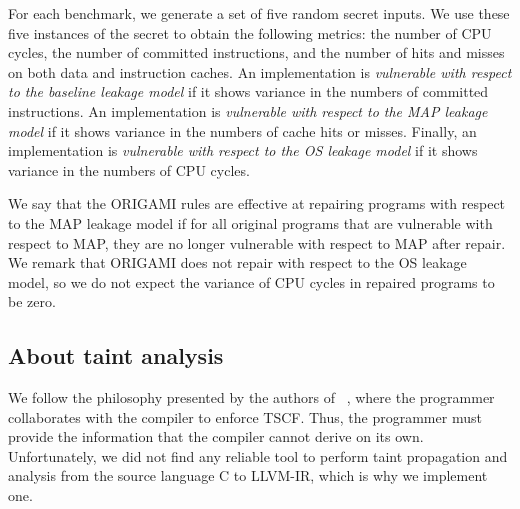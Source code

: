 { %

For each benchmark, we generate a set of five random secret inputs. %
We use these five instances of the secret to obtain the following metrics: the number of CPU cycles, the number of committed instructions, and the number of hits and misses on both data and instruction caches. An implementation is \emph{vulnerable with respect to the baseline leakage model} if it shows variance in the numbers of committed instructions. An implementation is \emph{vulnerable with respect to the MAP leakage model} if it shows variance in the numbers of cache hits or misses.  Finally, an implementation is \emph{vulnerable with respect to the OS leakage model} if it shows variance in the numbers of CPU cycles. 

We say that the ORIGAMI rules are effective at repairing programs with respect to the MAP leakage model if for all original programs that are vulnerable with respect to MAP, they are no longer vulnerable with respect to MAP after repair. We remark that ORIGAMI does not repair with respect to the OS leakage model, so we do not expect the variance of CPU cycles in repaired programs to be zero.

\subsection{About taint analysis} 
\label{sec:taint}
We follow the philosophy presented by the authors of ~\cite{WhatYouCisWhatYouGet}, where the programmer collaborates with the compiler to enforce TSCF. Thus, the programmer must provide the information that the compiler cannot derive on its own. Unfortunately, we did not find any reliable tool to perform taint propagation and analysis from the source language C to LLVM-IR, which is why we implement one. %

}
